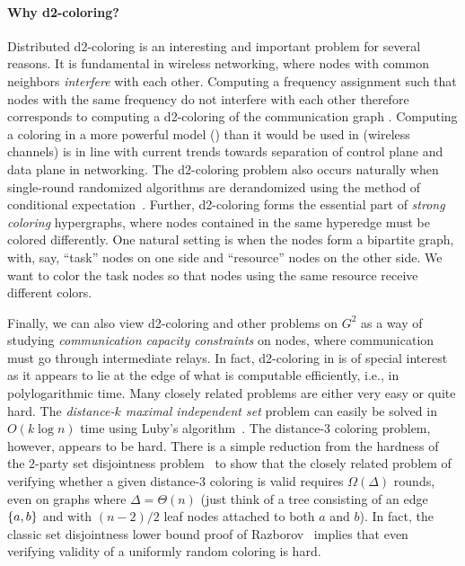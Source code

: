 \paragraph{Why d2-coloring?} Distributed d2-coloring is an interesting and important problem for several reasons. It is fundamental in wireless networking, where nodes with common neighbors \emph{interfere} with each other. Computing a frequency assignment such that nodes with the same frequency do not interfere with each other therefore corresponds to computing a d2-coloring of the communication graph \cite{KMR01}. Computing a coloring in a more powerful model (\congest) than it would be used in (wireless channels) is in line with current trends towards separation of control plane and data plane in networking. The d2-coloring problem also occurs naturally when single-round randomized algorithms are derandomized using the method of conditional expectation~\cite{derandomization_FOCS18}. Further, d2-coloring forms the essential part of \emph{strong coloring} hypergraphs, where nodes contained in the same hyperedge must be colored differently. One natural setting is when the nodes form a bipartite graph, with, say, ``task'' nodes on one side and ``resource'' nodes on the other side. We want to color the task nodes so that nodes using the same resource receive different colors. 


Finally, we can also view d2-coloring and other problems on $G^2$ as a way of studying \emph{communication capacity constraints} on nodes, where communication must go through intermediate relays. In fact, d2-coloring in \CONGEST is of special interest as it appears to lie at the edge of what is computable efficiently, i.e., in polylogarithmic time. Many closely related problems are either very easy or quite hard. The \emph{distance-$k$ maximal independent set} problem can easily be solved in $O(k\log n)$ time using Luby's algorithm~\cite{alon86,luby86}. The distance-3 coloring problem, however, appears to be hard. There is a simple reduction from the hardness of the $2$-party set disjointness problem~\cite{kalyanasundaram92,razborov92} to show that the closely related problem of verifying whether a given distance-$3$ coloring is valid requires $\Omega(\Delta)$ rounds, even on graphs where $\Delta=\Theta(n)$ (just think of a tree consisting of an edge $\left\{a,b\right\}$ and with $(n-2)/2$ leaf nodes attached to both $a$ and $b$). In fact, the classic set disjointness lower bound proof of Razborov~\cite{razborov92} implies that even verifying validity of a uniformly random coloring is hard.

